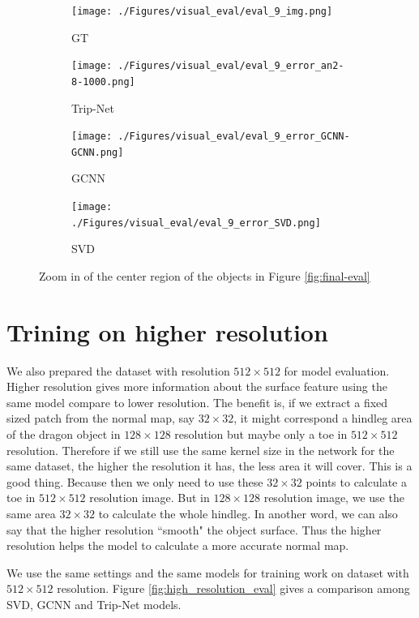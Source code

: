 \documentclass[border=15pt, multi, tikz]{article}
\begin{document}
\begin{figure}
	
	\begin{subfigure}[b]{0.24\linewidth}
		\texttt{[image: ./Figures/visual\_eval/eval\_9\_img.png]}
		\caption{GT}
	\end{subfigure}
	\begin{subfigure}[b]{0.24\linewidth}
		\texttt{[image: ./Figures/visual\_eval/eval\_9\_error\_an2-8-1000.png]}
		\caption{Trip-Net}
	\end{subfigure}
	\begin{subfigure}[b]{0.24\linewidth}
		\texttt{[image: ./Figures/visual\_eval/eval\_9\_error\_GCNN-GCNN.png]}
		\caption{GCNN}
	\end{subfigure}
	\begin{subfigure}[b]{0.24\linewidth}
		\texttt{[image: ./Figures/visual\_eval/eval\_9\_error\_SVD.png]}
		\caption{SVD}
	\end{subfigure}
	
	\caption{Zoom in of the center region of the objects in Figure \ref{fig:final-eval}}
	\label{fig:final-eval-zoom-in}
\end{figure}


\section{Trining on higher resolution}
We also prepared the dataset with resolution $ 512\times 512 $ for model evaluation. Higher resolution gives more information about the surface feature using the same model compare to lower resolution. The benefit is, if we extract a fixed sized patch from the normal map, say $ 32 \times 32 $, it might correspond a hindleg area of the dragon object in $ 128\times 128 $ resolution but maybe only a toe in $ 512\times 512 $ resolution. Therefore if we still use the same kernel size in the network for the same dataset, the higher the resolution it has, the less area it will cover. This is a good thing. Because then we only need to use these $ 32\times 32 $ points to calculate a toe in $ 512\times512 $ resolution image. But in $ 128\times128 $ resolution image, we use the same area $ 32\times32 $ to calculate the whole hindleg. In another word, we can also say that the higher resolution ``smooth" the object surface. Thus the higher resolution helps the model to calculate a more accurate normal map. 

We use the same settings and the same models for training work on dataset with $ 512\times512 $ resolution. Figure \ref{fig:high_resolution_eval} gives a comparison among SVD, GCNN and Trip-Net models.
\end{document}
